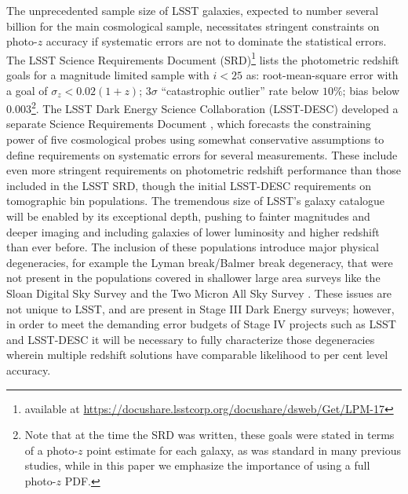 The unprecedented sample size of LSST galaxies, expected to number several billion for the main cosmological sample, necessitates stringent constraints on photo-$z$ accuracy if systematic errors are not to dominate the statistical errors.
The LSST Science Requirements Document (SRD)\footnote{available at \url{https://docushare.lsstcorp.org/docushare/dsweb/Get/LPM-17}} lists the photometric redshift goals for a magnitude limited sample with $i<25$ as: root-mean-square error with a goal of $\sigma_z<0.02(1+z)$; $3\sigma$ ``catastrophic outlier'' rate below $10\%$; bias below $0.003$\footnote{
Note that at the time the SRD was written, these goals were stated in terms of a photo-$z$ point estimate for each galaxy, as was standard in many previous studies, while in this paper we emphasize the importance of using a full photo-$z$ PDF.}.  The LSST Dark Energy Science Collaboration (LSST-DESC) developed a separate Science Requirements Document \citep{Mandelbaum:2018}, which forecasts the constraining power of five cosmological probes using somewhat conservative assumptions to define requirements on systematic errors for several measurements.  These include even more stringent requirements on photometric redshift performance than those included in the LSST SRD, though the initial LSST-DESC requirements on tomographic bin populations.  The tremendous size of LSST's galaxy catalogue will be enabled by its exceptional depth, pushing to fainter magnitudes and deeper imaging and including galaxies of lower luminosity and higher redshift than ever before.
The inclusion of these populations introduce major physical degeneracies, for example the Lyman break/Balmer break degeneracy, that were not present in the populations covered in shallower large area surveys like the Sloan Digital Sky Survey \citep[SDSS,][]{York:00} and the Two Micron All Sky Survey \citep[2MASS,][]{Skrutskie:06}.  These issues are not unique to LSST, and are present in Stage III Dark Energy surveys; however,
in order to meet the demanding error budgets of Stage IV projects such as LSST and LSST-DESC it will be necessary to fully characterize those degeneracies wherein multiple redshift solutions have comparable likelihood to per cent level accuracy.

